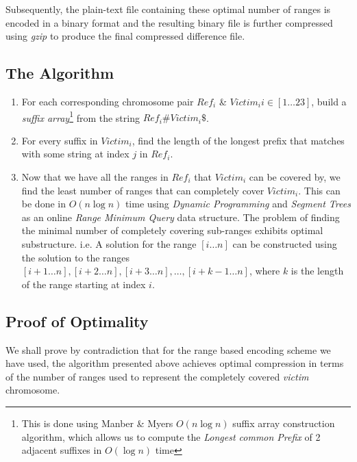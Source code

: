 \documentclass[11pt]{article}
\begin{document}
Subsequently, the plain-text file containing these optimal number of
ranges is encoded in a binary format and the resulting binary file is
further compressed using \textit{gzip} to produce the final compressed
difference file.

\subsection{The Algorithm}

\begin{enumerate}

\item For each corresponding chromosome pair ${Ref}_i$ \& $Victim_i i
  \in [1\ldots{}23]$, build a
  \textit{suffix array}\footnote{This is done using Manber \& Myers
    $O(n\log{n})$ suffix array construction
    algorithm\cite{manbermyers}, which allows us to compute the
    \textit{Longest common Prefix} of 2 adjacent suffixes in
    $O(\log{n})$ time} from the string $Ref_i\#Victim_i\$$.

\item For every suffix in ${Victim}_i$, find the length of the longest
  prefix that matches with some string at index $j$ in ${Ref}_i$.

\item Now that we have all the ranges in $Ref_i$ that $Victim_i$ can
  be covered by, we find the least number of ranges that can
  completely cover $Victim_i$. This can be done in $O(n\log{n})$ time
  using \textit{Dynamic Programming} and \textit{Segment Trees} as an
  online \textit{Range Minimum Query} data structure. The problem of
  finding the minimal number of completely covering sub-ranges
  exhibits optimal substructure. i.e. A solution for the range
  $[i\ldots{}n]$ can be constructed using the solution to the ranges
  $[i+1\ldots{}n], [i+2\ldots{}n], [i+3\ldots{}n], \ldots{},
  [i+k-1\ldots{}n]$, where $k$ is the length of the range starting at
  index $i$.

\end{enumerate}

\subsection{Proof of Optimality}

We shall prove by contradiction that for the range based encoding
scheme we have used, the algorithm presented above achieves optimal
compression in terms of the number of ranges used to represent the
completely covered \textit{victim} chromosome.
\end{document}
